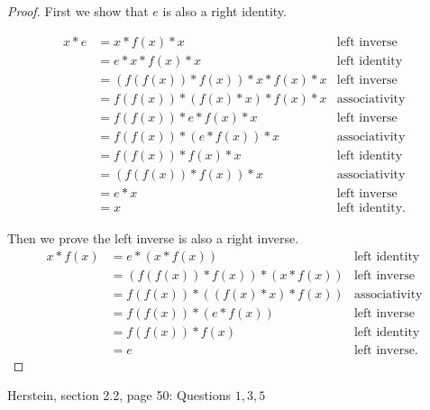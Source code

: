 \begin{enumerate}
\begin{proof}
First we show that $e$ is also a right identity.

	\begin{align*}
		x*e &= x*f(x)*x &\text{left inverse} \\
		    &= e*x*f(x)*x &\text{left identity} \\
		    &= \left( f(f(x))*f(x) \right) *x*f(x)*x &\text{left inverse} \\
		    &=  f(f(x))*\left( f(x)  *x \right) *f(x)*x &\text{associativity} \\
		    &=  f(f(x))*e  *f(x)*x &\text{left inverse} \\
		    &=  f(f(x))*\left( e  *f(x) \right) *x &\text{associativity} \\
		    &=  f(f(x))* f(x)  *x &\text{left identity} \\
		    &=  \left( f(f(x))* f(x) \right)   *x &\text{associativity} \\
		    &=   e  *x &\text{left inverse} \\
		    &= x &\text{left identity} 
	.\end{align*}

	Then we prove the left inverse is also a right inverse.
	\begin{align*}
		x * f(x) &=  e * \left( x * f(x) \right) & \text{left identity} \\
			 &= \left( f(f(x))*f(x) \right) * (x * f(x)) &\text{left inverse}\\
			 &= f(f(x))*((f(x)*x)*f(x)) &\text{associativity} \\
			 &= f(f(x))*(e*f(x)) &\text{left inverse} \\
			 &= f(f(x))*f(x) &\text{left identity} \\
			 &= e & \text{left inverse}
	.\end{align*}

	\end{proof}

\end{enumerate}
Herstein, section 2.2, page 50: Questions $1,3,5$
